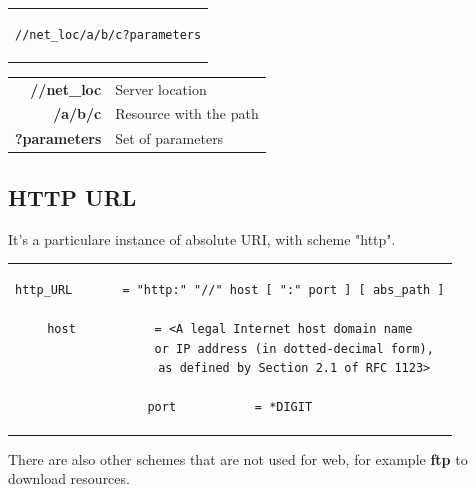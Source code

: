 \begin{center}
\begin{tabular}{c}
\begin{lstlisting}[linewidth=320pt, basicstyle=\footnotesize\sffamily,]
//net_loc/a/b/c?parameters
\end{lstlisting}
\end{tabular}
\end{center}
\begin{table}[h]
\centering \footnotesize
\begin{tabular}{rl}
\textbf{//net\_loc}&{Server location}\\
\textbf{/a/b/c}&{Resource with the path}\\
\textbf{?parameters}&{Set of parameters}
\end{tabular}
\end{table}

\subsection{HTTP URL}
It's a particulare instance of absolute URI, with scheme "http".
\begin{center}
\begin{tabular}{c}
\begin{lstlisting}[linewidth=320pt, basicstyle=\footnotesize\sffamily,]
http_URL       = "http:" "//" host [ ":" port ] [ abs_path ]

host           = <A legal Internet host domain name
                  or IP address (in dotted-decimal form),
                  as defined by Section 2.1 of RFC 1123>

port           = *DIGIT
\end{lstlisting}
\end{tabular}
\end{center}
There are also other schemes that are not used for web\cite{URIschemes}, for example \textbf{ftp} to download resources.

